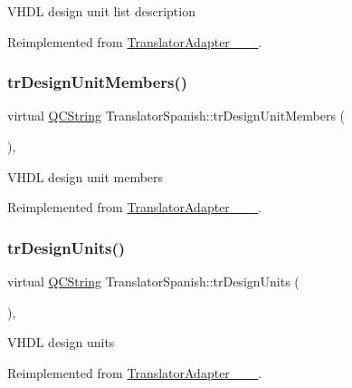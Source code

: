 V\+H\+DL design unit list description 

Reimplemented from \mbox{\hyperlink{class_translator_adapter__1__8__15}{Translator\+Adapter\+\_\+\_\+\_}}.

\mbox{\label{class_translator_spanish_ae412421c09e47180067fe21c17e292ec}} 
\subsubsection{\texorpdfstring{trDesignUnitMembers()}{trDesignUnitMembers()}}
{\footnotesize\ttfamily virtual \mbox{\hyperlink{class_q_c_string}{Q\+C\+String}} Translator\+Spanish\+::tr\+Design\+Unit\+Members (\begin{DoxyParamCaption}{ }\end{DoxyParamCaption})\hspace{0.3cm}{\ttfamily [inline]}, {\ttfamily [virtual]}}

V\+H\+DL design unit members 

Reimplemented from \mbox{\hyperlink{class_translator_adapter__1__8__15}{Translator\+Adapter\+\_\+\_\+\_}}.

\mbox{\label{class_translator_spanish_a416bc6b542e26a47df4bd14dbe398687}} 
\subsubsection{\texorpdfstring{trDesignUnits()}{trDesignUnits()}}
{\footnotesize\ttfamily virtual \mbox{\hyperlink{class_q_c_string}{Q\+C\+String}} Translator\+Spanish\+::tr\+Design\+Units (\begin{DoxyParamCaption}{ }\end{DoxyParamCaption})\hspace{0.3cm}{\ttfamily [inline]}, {\ttfamily [virtual]}}

V\+H\+DL design units 

Reimplemented from \mbox{\hyperlink{class_translator_adapter__1__8__15}{Translator\+Adapter\+\_\+\_\+\_}}.

\mbox{\label{class_translator_spanish_aadf1ecaa7e3dd00325363fda155f2127}} 
